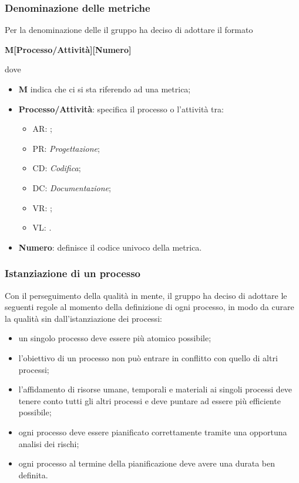 {{\subsubsection{Denominazione delle metriche}
Per la denominazione delle  il gruppo ha deciso di adottare il formato\newline \centerline{\textbf{M[Processo/Attività][Numero]}}\newline
dove
\begin{itemize}
	\item \textbf{M} indica che ci si sta riferendo ad una metrica;
	\item \textbf{Processo/Attività}: specifica il processo o l'attività tra:
	\begin{itemize}
		\item AR: \AdR{};
		\item PR: \emph{Progettazione};
		\item CD: \emph{Codifica};
		\item DC: \emph{Documentazione};
		\item VR: \emph{};
		\item VL: \emph{}.
	\end{itemize}
	\item \textbf{Numero}: definisce il codice univoco della metrica.
\end{itemize}
\subsubsection{Istanziazione di un processo}
Con il perseguimento della qualità in mente, il gruppo \textit{\Gruppo{}} ha deciso di adottare le seguenti regole al momento della definizione di ogni processo, in modo da curare la qualità sin dall'istanziazione dei processi:
\begin{itemize}
	\item un singolo processo deve essere più atomico possibile;
	\item l'obiettivo di un processo non può entrare in conflitto con quello di altri processi;
	\item l'affidamento di risorse umane, temporali e materiali ai singoli processi deve tenere conto tutti gli altri processi e deve puntare ad essere più efficiente possibile;
	\item ogni processo deve essere pianificato correttamente tramite una opportuna analisi dei rischi;
	\item ogni processo al termine della pianificazione deve avere una durata ben definita.
\end{itemize}
}}
